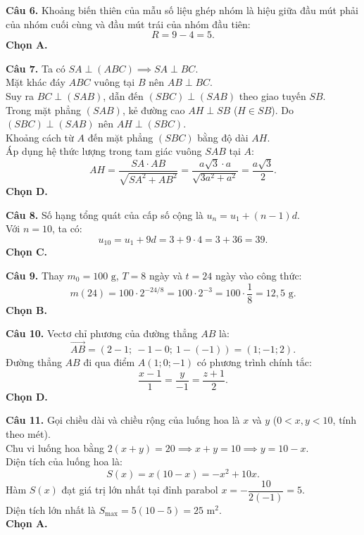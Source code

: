 \documentclass[12pt,a4paper]{article}
\begin{document}
\vspace{0.25cm}
\noindent\textbf{Câu 6.} Khoảng biến thiên của mẫu số liệu ghép nhóm là hiệu giữa đầu mút phải của nhóm cuối cùng và đầu mút trái của nhóm đầu tiên:
\[
R = 9 - 4 = 5.
\]
\textbf{Chọn A.}

\vspace{0.25cm}
\noindent\textbf{Câu 7.} Ta có $SA \perp (ABC) \implies SA \perp BC$.\\
Mặt khác đáy $ABC$ vuông tại $B$ nên $AB \perp BC$.\\
Suy ra $BC \perp (SAB)$, dẫn đến $(SBC) \perp (SAB)$ theo giao tuyến $SB$.\\
Trong mặt phẳng $(SAB)$, kẻ đường cao $AH \perp SB$ ($H \in SB$). Do $(SBC) \perp (SAB)$ nên $AH \perp (SBC)$.\\
Khoảng cách từ $A$ đến mặt phẳng $(SBC)$ bằng độ dài $AH$.\\
Áp dụng hệ thức lượng trong tam giác vuông $SAB$ tại $A$:
\[
AH = \dfrac{SA \cdot AB}{\sqrt{SA^2 + AB^2}} = \dfrac{a\sqrt{3} \cdot a}{\sqrt{3a^2 + a^2}} = \dfrac{a\sqrt{3}}{2}.
\]
\textbf{Chọn D.}

\vspace{0.25cm}
\noindent\textbf{Câu 8.} Số hạng tổng quát của cấp số cộng là $u_n = u_1 + (n - 1)d$.\\
Với $n = 10$, ta có:
\[
u_{10} = u_1 + 9d = 3 + 9 \cdot 4 = 3 + 36 = 39.
\]
\textbf{Chọn C.}

\vspace{0.25cm}
\noindent\textbf{Câu 9.} Thay $m_0 = 100\text{ g}$, $T = 8$ ngày và $t = 24$ ngày vào công thức:
\[
m(24) = 100 \cdot 2^{-24/8} = 100 \cdot 2^{-3} = 100 \cdot \dfrac{1}{8} = 12{,}5\text{ g}.
\]
\textbf{Chọn B.}

\vspace{0.25cm}
\noindent\textbf{Câu 10.} Vectơ chỉ phương của đường thẳng $AB$ là:
\[
\vec{AB} = (2 - 1;\ -1 - 0;\ 1 - (-1)) = (1; -1; 2).
\]
Đường thẳng $AB$ đi qua điểm $A(1; 0; -1)$ có phương trình chính tắc:
\[
\dfrac{x - 1}{1} = \dfrac{y}{-1} = \dfrac{z + 1}{2}.
\]
\textbf{Chọn D.}

\vspace{0.25cm}
\noindent\textbf{Câu 11.} Gọi chiều dài và chiều rộng của luống hoa là $x$ và $y$ ($0 < x, y < 10$, tính theo mét).\\
Chu vi luống hoa bằng $2(x + y) = 20 \implies x + y = 10 \implies y = 10 - x$.\\
Diện tích của luống hoa là:
\[
S(x) = x(10 - x) = -x^2 + 10x.
\]
Hàm $S(x)$ đạt giá trị lớn nhất tại đỉnh parabol $x = -\dfrac{10}{2(-1)} = 5$.\\
Diện tích lớn nhất là $S_{\max} = 5(10 - 5) = 25\text{ m}^2$.\\
\textbf{Chọn A.}
\end{document}
